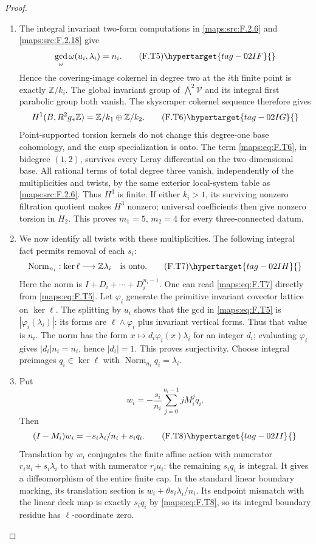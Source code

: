 \begin{proof}
\begin{enumerate}[label={$\langle1\rangle$\arabic*.}]
\item The integral invariant two-form computations in \ref{maps:src:F.2.6} and
\ref{maps:src:F.2.18} give
\[
 \gcd_{\omega}\omega(u_i,\lambda_i)=n_i.
 \tag{F.T5}\hypertarget{tag-02IF}{}\label{maps:eq:F.T5}
\]
Hence the covering-image cokernel in degree two at the
$i$th finite point is exactly $\mathbb Z/k_i$.
The global invariant group of $\bigwedge^2\mathcal V$
and its integral first parabolic group both vanish.
The skyscraper cokernel sequence therefore gives
\[
 H^1(B,R^2g_*\mathbb Z)
       =\mathbb Z/k_1\oplus\mathbb Z/k_2.
 \tag{F.T6}\hypertarget{tag-02IG}{}\label{maps:eq:F.T6}
\]
Point-supported torsion kernels do not change this degree-one
base cohomology, and the cusp specialization is onto.
The term \eqref{maps:eq:F.T6}, in bidegree $(1,2)$, survives every Leray
differential on the two-dimensional base.
All rational terms of total degree three vanish, independently
of the multiplicities and twists, by the same exterior
local-system table as \ref{maps:src:F.2.6}.  Thus $H^3$ is finite.
If either $k_i>1$, its surviving nonzero filtration quotient
makes $H^3$ nonzero; universal coefficients then give
nonzero torsion in $H_2$.
This proves $m_1=5$, $m_2=4$ for every three-connected datum.

\item We now identify all twists with these multiplicities.
The following integral fact permits removal of each $s_i$:
\[
 \operatorname{Norm}_{n_i}:
 \ker\ell\longrightarrow\mathbb Z\lambda_i
 \quad\text{is onto}.
 \tag{F.T7}\hypertarget{tag-02IH}{}\label{maps:eq:F.T7}
\]
Here the norm is $I+D_i+\cdots+D_i^{n_i-1}$.
One can read \eqref{maps:eq:F.T7} directly from \eqref{maps:eq:F.T5}.
Let $\varphi_i$ generate the primitive invariant covector
lattice on $\ker\ell$.
The splitting by $u_i$ shows that the gcd in \eqref{maps:eq:F.T5} is
$|\varphi_i(\lambda_i)|$: its forms are
$\ell\wedge\varphi_i$ plus invariant vertical forms.
Thus that value is $n_i$.
The norm has the form
$x\mapsto d_i\varphi_i(x)\lambda_i$ for an integer
$d_i$; evaluating $\varphi_i$ gives
$|d_i|n_i=n_i$, hence $|d_i|=1$.
This proves surjectivity. Choose integral preimages
$q_i\in\ker\ell$ with
$\operatorname{Norm}_{n_i}q_i=\lambda_i$.

\item Put
\[
 w_i=-\frac{s_i}{n_i}\sum_{j=0}^{n_i-1}jM_i^j q_i.
\]
Then
\[
 (I-M_i)w_i=-s_i\lambda_i/n_i+s_iq_i.
 \tag{F.T8}\hypertarget{tag-02II}{}\label{maps:eq:F.T8}
\]
Translation by $w_i$ conjugates the finite affine action
with numerator $r_i u_i+s_i\lambda_i$ to that with
numerator $r_i u_i$: the remaining $s_iq_i$ is integral.
It gives a diffeomorphism of the entire finite cap.
In the standard linear boundary marking, its translation
section is
$w_i+\theta s_i\lambda_i/n_i$.
Its endpoint mismatch with the linear deck map is exactly
$s_iq_i$ by \eqref{maps:eq:F.T8}, so its integral boundary residue has
$\ell$-coordinate zero.


\end{enumerate}
\end{proof}
